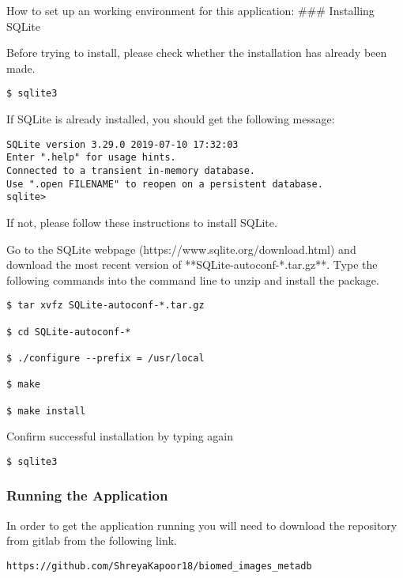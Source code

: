 How to set up an working environment for this application: \#\#\#
Installing SQLite

Before trying to install, please check whether the installation has
already been made.

\begin{verbatim}
$ sqlite3
\end{verbatim}

If SQLite is already installed, you should get the following message:

\begin{verbatim}
SQLite version 3.29.0 2019-07-10 17:32:03
Enter ".help" for usage hints.
Connected to a transient in-memory database.
Use ".open FILENAME" to reopen on a persistent database.
sqlite>
\end{verbatim}

If not, please follow these instructions to install SQLite.

Go to the SQLite webpage (https://www.sqlite.org/download.html) and
download the most recent version of **SQLite-autoconf-*.tar.gz**. Type
the following commands into the command line to unzip and install the
package.

\begin{verbatim}
$ tar xvfz SQLite-autoconf-*.tar.gz

$ cd SQLite-autoconf-*

$ ./configure --prefix = /usr/local

$ make

$ make install
\end{verbatim}

Confirm successful installation by typing again

\begin{verbatim}
$ sqlite3
\end{verbatim}

\hypertarget{running-the-application}{%
\subsubsection{Running the Application}\label{running-the-application}}

In order to get the application running you will need to download the
repository from gitlab from the following link.

\begin{verbatim}
https://github.com/ShreyaKapoor18/biomed_images_metadb
\end{verbatim}

